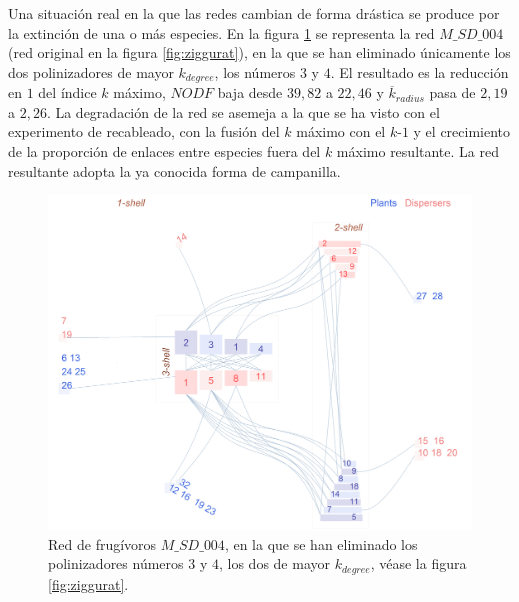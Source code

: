 Una situación real en la que las redes cambian de forma drástica se produce por la extinción de una o más especies. En la figura \ref{fig:VIS_M_SD_004_pol3_pol4_ziggurat} se representa la red $M\_SD\_004$ (red original en la figura \ref{fig:ziggurat}), en la que se han eliminado únicamente los dos polinizadores de mayor $k_{degree}$, los números $3$ y $4$. El resultado es la reducción en $1$ del índice $k$ máximo, $NODF$ baja desde $39,82$ a $22,46$ y $\overline k_{radius}$ pasa de $2,19$ a $2,26$. La degradación de la red se asemeja a la que se ha visto con el experimento de recableado, con la fusión del $k$ máximo con el $k$-$1$ y el crecimiento de la proporción de enlaces entre especies fuera del $k$ máximo resultante. La red resultante adopta la ya conocida forma de campanilla.

\begin{figure}[ht!]
\centering
\includegraphics[scale=0.5]{Figures/VIS_M_SD_004_pol3_pol4_ziggurat.png}
\caption {Red de frugívoros $M\_SD\_004$, en la que se han eliminado los polinizadores números $3$ y $4$, los dos de mayor $k_{degree}$, véase la figura \ref{fig:ziggurat}.} 
\label{fig:VIS_M_SD_004_pol3_pol4_ziggurat}
\end{figure}

